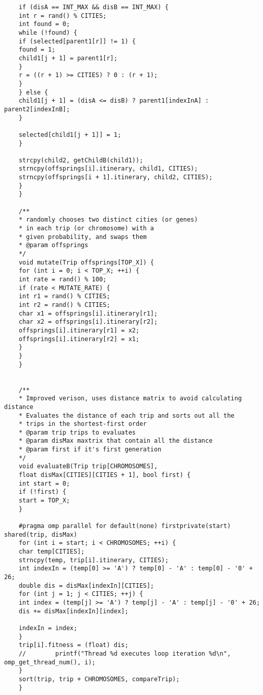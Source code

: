 \documentclass[11pt, letterpaper]{article}
\begin{document}
\begin{lstlisting}
	if (disA == INT_MAX && disB == INT_MAX) {
	int r = rand() % CITIES;
	int found = 0;
	while (!found) {
	if (selected[parent1[r]] != 1) {
	found = 1;
	child1[j + 1] = parent1[r];
	}
	r = ((r + 1) >= CITIES) ? 0 : (r + 1);
	}
	} else {
	child1[j + 1] = (disA <= disB) ? parent1[indexInA] : parent2[indexInB];
	}
	
	selected[child1[j + 1]] = 1;
	}
	
	strcpy(child2, getChildB(child1));
	strncpy(offsprings[i].itinerary, child1, CITIES);
	strncpy(offsprings[i + 1].itinerary, child2, CITIES);
	}
	}
	
	/**
	* randomly chooses two distinct cities (or genes)
	* in each trip (or chromosome) with a
	* given probability, and swaps them
	* @param offsprings
	*/
	void mutate(Trip offsprings[TOP_X]) {
	for (int i = 0; i < TOP_X; ++i) {
	int rate = rand() % 100;
	if (rate < MUTATE_RATE) {
	int r1 = rand() % CITIES;
	int r2 = rand() % CITIES;
	char x1 = offsprings[i].itinerary[r1];
	char x2 = offsprings[i].itinerary[r2];
	offsprings[i].itinerary[r1] = x2;
	offsprings[i].itinerary[r2] = x1;
	}
	}
	}
	
	
	/**
	* Improved verison, uses distance matrix to avoid calculating distance
	* Evaluates the distance of each trip and sorts out all the
	* trips in the shortest-first order
	* @param trip trips to evaluates
	* @param disMax maxtrix that contain all the distance
	* @param first if it's first generation
	*/
	void evaluateB(Trip trip[CHROMOSOMES], 
	float disMax[CITIES][CITIES + 1], bool first) {
	int start = 0;
	if (!first) {
	start = TOP_X;
	}
	
	#pragma omp parallel for default(none) firstprivate(start) shared(trip, disMax)
	for (int i = start; i < CHROMOSOMES; ++i) {
	char temp[CITIES];
	strncpy(temp, trip[i].itinerary, CITIES);
	int indexIn = (temp[0] >= 'A') ? temp[0] - 'A' : temp[0] - '0' + 26;
	double dis = disMax[indexIn][CITIES];
	for (int j = 1; j < CITIES; ++j) {
	int index = (temp[j] >= 'A') ? temp[j] - 'A' : temp[j] - '0' + 26;
	dis += disMax[indexIn][index];
	
	indexIn = index;
	}
	trip[i].fitness = (float) dis;
	//        printf("Thread %d executes loop iteration %d\n", omp_get_thread_num(), i);
	}
	sort(trip, trip + CHROMOSOMES, compareTrip);
	}
	\end{lstlisting}
	\pagebreak
\end{document}

